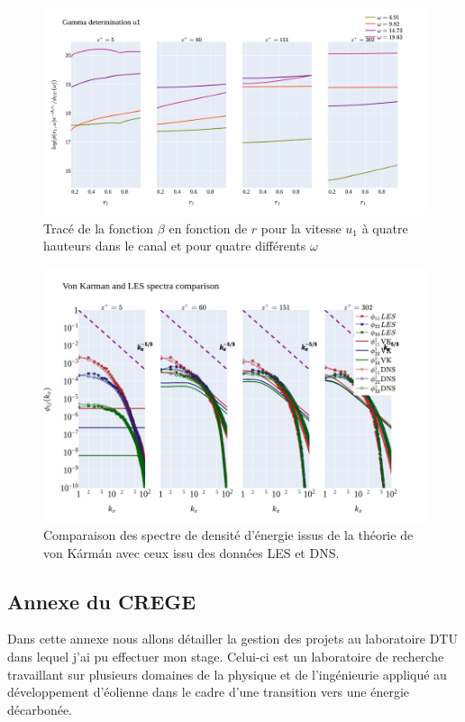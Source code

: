 \documentclass[12pt]{article}
\theoremstyle{plain}
\theoremstyle{remark}
\begin{document}
\begin{figure}[H]
	\begin{center}
		\includegraphics[width=0.9\linewidth]{../../output/figures/channel_wrles_retau395/split_time/gamma/gamma_u1_r.png}
		\caption{Tracé de la fonction $\beta$ en fonction de $r$ pour la vitesse $u_1$ à quatre hauteurs dans le canal et pour quatre différents $\omega$}
		\label{fig:gamma_r}
	\end{center}
\end{figure}

\begin{figure}[H]
	\begin{center}
		\includegraphics[width=0.9\linewidth]{../../output/figures/channel_wrles_retau395/split_time/von_karman/von_karman_spectra.png}
		\caption{Comparaison des spectre de densité d'énergie issus de la théorie de von Kármán avec ceux issu des données LES et DNS.}
		\label{fig:vk_spectra_zoom}
	\end{center}
\end{figure}

\pagebreak


\subsection{Annexe du CREGE}

Dans cette annexe nous allons détailler la gestion des projets au laboratoire DTU dans lequel j'ai pu effectuer mon stage. Celui-ci est un laboratoire de recherche travaillant sur plusieurs domaines de la physique et de l'ingénieurie appliqué au développement d'éolienne dans le cadre d'une transition vers une énergie décarbonée.

\pagebreak


	
	
\end{document}
